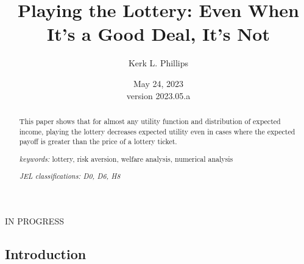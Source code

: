 \documentclass[letterpaper,12pt]{article}
\numberwithin{equation}{section}
\numberwithin{figure}{section}
\numberwithin{table}{section}
\begin{document}
\begin{titlepage}
	\title{Playing the Lottery: Even When It's a Good Deal, It's Not}

	\author[1]{Kerk L. Phillips}



	\date{May 24, 2023\\
	\small{version 2023.05.a}}

	
	\maketitle

	\vspace{-0.3in}
	\begin{abstract}
	\small{
	This paper shows that for almost any utility function and distribution of expected income, playing the lottery decreases expected utility even in cases where the expected payoff is greater than the price of a lottery ticket.

	\vspace{0.1in}

	\textit{keywords:} lottery, risk aversion, welfare analysis, numerical analysis

	\vspace{0.1in}

	\textit{JEL classifications: D0, D6, H8} }
	\end{abstract}

	\centering
	IN PROGRESS

	\thispagestyle{empty}
\end{titlepage}

\begin{spacing}{1.5}

\section{Introduction} \label{sec_intro}

	

\newpage


\end{spacing}
\end{document}
